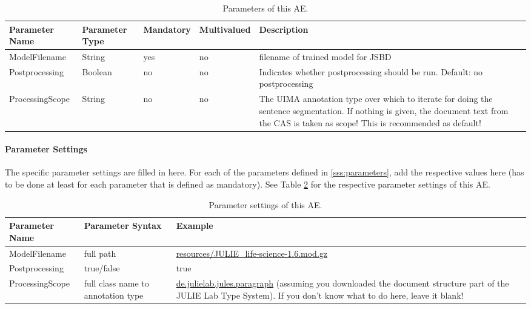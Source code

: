 \documentclass[11pt,a4paper,halfparskip]{scrartcl}
\begin{document}
\begin{table}[h!]
  \centering
  \begin{tabular}{|p{4cm}|p{2cm}|p{2cm}|p{2cm}|p{4cm}|}
    \hline
    Parameter Name & Parameter Type & Mandatory & Multivalued & Description \\
    \hline\hline
    ModelFilename & String & yes & no & filename of trained model for
    JSBD\\
    \hline
    Postprocessing & Boolean & no & no & Indicates whether postprocessing should be run. Default: no postprocessing\\
    \hline
    ProcessingScope & String & no & no & The UIMA annotation type  over which to iterate for doing the sentence segmentation. If nothing is given, the document text from the CAS is taken as scope! This is recommended as default!\\
    \hline
  \end{tabular}
  \caption{Parameters of this AE.}
  \label{tab:parameters}
\end{table}


\paragraph{Parameter Settings}
\label{sss:param_settings}

The specific parameter settings are filled in here. For each of the
parameters defined in \ref{sss:parameters}, add the respective values
here (has to be done at least for each parameter that is defined as
mandatory). See Table \ref{tab:param_settings} for the respective
parameter settings of this AE.

\begin{table}[h!]
  \centering
  \begin{tabular}{|p{4cm}|p{4cm}|p{7cm}|}
    \hline
    Parameter Name & Parameter Syntax & Example \\
    \hline\hline
    ModelFilename & full path & \url{resources/JULIE_life-science-1.6.mod.gz}\\
    \hline
    Postprocessing & true/false & true\\
    \hline 
    ProcessingScope & full class name to annotation type & \url{de.julielab.jules.paragraph} (assuming you downloaded the document structure part of the JULIE Lab Type System). If you don't know what to do here, leave it blank!\\
  \hline
  \end{tabular}
  \caption{Parameter settings of this AE.}
  \label{tab:param_settings}
\end{table}
\end{document}
